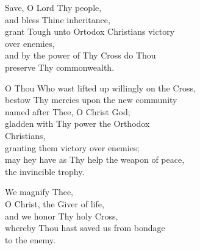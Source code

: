 \documentclass{article}
\begin{document}
%
%
Save, O Lord Thy people,\\
and bless Thine inheritance,\\
grant Tough unto Ortodox Christians victory \\
   \cont over enemies,\\
and by the power of Thy Cross do Thou \\
   \cont preserve Thy commonwealth.


%
O Thou Who wast lifted up willingly on the Cross, \\
bestow Thy mercies upon the new community \\
  \cont named after Thee, O Christ God; \\
gladden with Thy power the Orthodox \\
  \cont Christians,\\
granting them victory over enemies;\\
may hey have as Thy help the weapon of peace, \\
  \cont the invincible trophy.

%
We magnify Thee, \\
O Christ, the Giver of life, \\
and we honor Thy holy Cross, \\
whereby Thou hast saved us from bondage \\
  \cont to the enemy.
\end{document}

